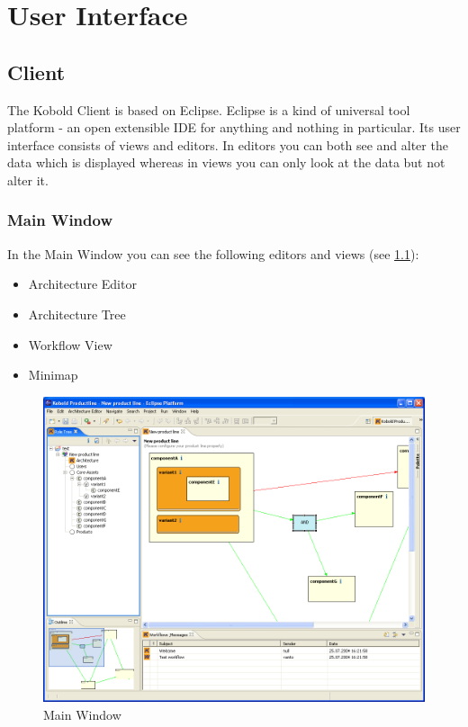 \chapter{User Interface}

\section{Client}

The Kobold Client is based on Eclipse. Eclipse is a kind of universal tool 
platform - an open extensible IDE for anything and nothing in particular. Its 
user interface consists of views and editors. In editors you can both see and 
alter the data which is displayed whereas in views you can only look at the data 
but not alter it.

\subsection{Main Window}
In the Main Window you can see the following editors and views (see \ref{main}):
\begin{itemize}
	\item Architecture Editor
	\item Architecture Tree
	\item Workflow View
	\item Minimap
\end{itemize}

\begin{figure}[h!]
\begin{center}
\includegraphics[width=15cm]{main.png}
   \caption{Main Window}
\label{main}
\end{center}
\end{figure}\par

